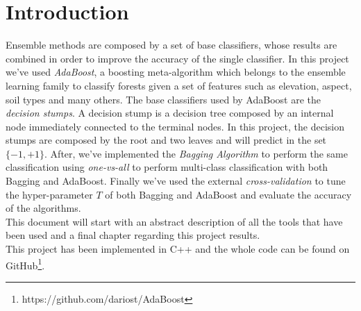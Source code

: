 \chapter{Introduction}
Ensemble methods are composed by a set of base classifiers, whose results are combined in order to improve the accuracy of the single classifier. In this project we've used \textit{AdaBoost}, a boosting meta-algorithm which belongs to the ensemble learning family to classify forests given a set of features such as elevation, aspect, soil types and many others. The base classifiers used by AdaBoost are the \textit{decision stumps}. A decision stump is a decision tree composed by an internal node immediately connected to the terminal nodes. In this project, the decision stumps are composed by the root and two leaves and will predict in the set $\lbrace-1, +1\rbrace$. After, we've implemented the \textit{Bagging Algorithm} to perform the same classification using \textit{one-vs-all} to perform multi-class classification with both Bagging and AdaBoost. Finally we've used the external \textit{cross-validation} to tune the hyper-parameter $T$ of both Bagging and AdaBoost and evaluate the accuracy of the algorithms. \\
This document will start with an abstract description of all the tools that have been used and a final chapter regarding this project results.\\
This project has been implemented in C++ and the whole code can be found on GitHub\footnote{https://github.com/dariost/AdaBoost}. 